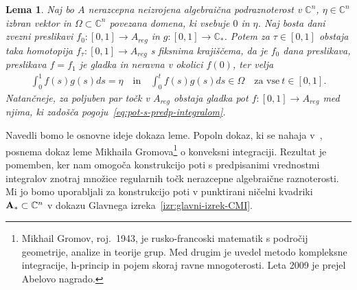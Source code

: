 \documentclass[12pt,a4paper,twoside]{article}
\theoremstyle{definition} %
\theoremstyle{plain} %
\newtheorem{lema}[definicija]{Lema}
\numberwithin{equation}{section}  %
\newcommand{\C}{\mathbb C}
\begin{document}
\begin{lema} \label{lema:analog-gromova}
Naj bo $A$ nerazcepna neizrojena algebraična podraznoterost v $\mathbb{C}^{n}$, $\eta \in \mathbb{C}^{n}$ izbran vektor in $\Omega \subset \mathbb{C}^{n}$ povezana domena, ki vsebuje $0$ in $\eta$. 
Naj bosta dani zvezni preslikavi $f_0 \colon [0,1] \to A_{reg}$ in $g \colon [0,1] \to \mathbb{C}_{*}$.
Potem za $\tau \in [0,1]$ obstaja taka homotopija $f_{\tau} \colon [0,1] \to A_{reg}$ s fiksnima krajiščema, da je $f_0$ dana preslikava, preslikava $f = f_1$ je gladka in neravna v okolici $f(0)$, ter velja
\begin{gather} \label{eq:pot-s-predp-integralom}
\int_{0}^{1} f(s)g(s)ds = \eta \quad \textrm{in} \quad \int_{0}^{t} f(s)g(s)ds \in \Omega \quad \textrm{za vse} \ t \in [0,1].
\end{gather}
Natančneje, za poljuben par točk v $A_{reg}$ obstaja gladka pot $f \colon [0,1] \to A_{reg}$ med njima, ki zadošča pogoju~\eqref{eq:pot-s-predp-integralom}.
\end{lema}

Navedli bomo le osnovne ideje dokaza leme. Popoln dokaz, ki se nahaja v~\cite[Lemma~3.5.4]{alarcon2021minimal}, posnema dokaz leme Mikhaila Gromova\footnote{Mikhail Gromov, roj.~1943, je rusko-francoski matematik s področij geometrije, analize in teorije grup. Med drugim je uvedel metodo kompleksne integracije, h-princip in pojem skoraj ravne mnogoterosti. Leta 2009 je prejel Abelovo nagrado.}
o konveksni integraciji. Rezultat je pomemben, ker nam omogoča konstrukcijo poti s predpisanimi vrednostmi integralov znotraj množice regularnih točk nerazcepne algebraične raznoterosti. Mi jo bomo uporabljali za konstrukcijo poti v punktirani ničelni kvadriki $\textup{\textbf{A}}_{*} \subset \C^{n}$ v dokazu Glavnega izreka~\ref{izr:glavni-izrek-CMI}.
\end{document}
